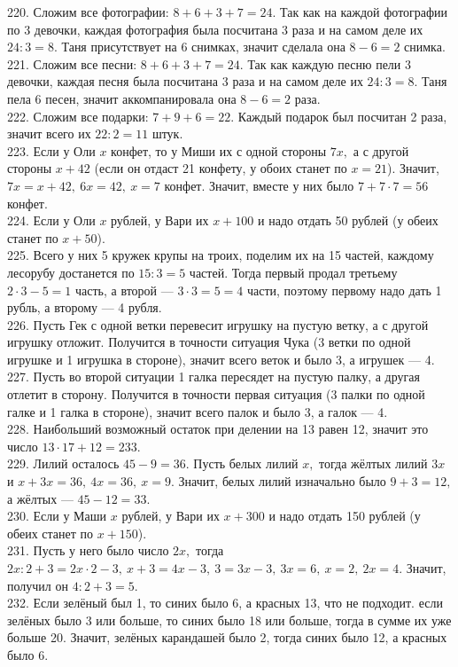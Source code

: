 \documentclass[12pt]{article}
\begin{document}
220. Сложим все фотографии: $8+6+3+7=24.$ Так как на каждой фотографии по 3 девочки, каждая фотография была посчитана 3 раза и на самом деле их $24:3=8.$ Таня присутствует на 6 снимках, значит сделала она $8-6=2$ снимка.\\
221. Сложим все песни: $8+6+3+7=24.$ Так как каждую песню пели 3 девочки, каждая песня была посчитана 3 раза и на самом деле их $24:3=8.$ Таня пела 6 песен, значит аккомпанировала она $8-6=2$ раза.\\
222. Сложим все подарки: $7+9+6=22.$ Каждый подарок был посчитан 2 раза, значит всего их $22:2=11$ штук.\\
223. Если у Оли $x$ конфет, то у Миши их с одной стороны $7x,$ а с другой стороны $x+42$ (если он отдаст 21 конфету, у обоих станет по $x=21$). Значит, $7x=x+42,\ 6x=42,\ x=7$ конфет. Значит, вместе у них было $7+7\cdot7=56$ конфет.\\
224. Если у Оли $x$ рублей, у Вари их $x+100$ и надо отдать 50 рублей (у обеих станет по $x+50$).\\
225. Всего у них 5 кружек крупы на троих, поделим их на 15 частей, каждому лесорубу достанется по $15:3=5$ частей. Тогда первый продал третьему $2\cdot3-5=1$ часть, а второй --- $3\cdot3=5=4$ части, поэтому первому надо дать 1 рубль, а второму --- 4 рубля.\\
226. Пусть Гек с одной ветки перевесит игрушку на пустую ветку, а с другой игрушку отложит. Получится в точности ситуация Чука (3 ветки по одной игрушке и 1 игрушка в стороне), значит всего веток и было 3, а игрушек --- 4.\\
227. Пусть во второй ситуации 1 галка пересядет на пустую палку, а другая отлетит в сторону. Получится в точности первая ситуация (3 палки по одной галке и 1 галка в стороне), значит всего палок и было 3, а галок --- 4.\\
228. Наибольший возможный остаток при делении на 13 равен 12, значит это число $13\cdot17+12=233.$\\
229. Лилий осталось $45-9=36.$ Пусть белых лилий $x,$ тогда жёлтых лилий $3x$ и $x+3x=36,\ 4x=36,\ x=9.$ Значит, белых лилий изначально было $9+3=12,$ а жёлтых --- $45-12=33.$\\
230. Если у Маши $x$ рублей, у Вари их $x+300$ и надо отдать 150 рублей (у обеих станет по $x+150$).\\
231. Пусть у него было число $2x,$ тогда $2x:2+3=2x\cdot2-3,\ x+3=4x-3,\ 3=3x-3,\ 3x=6,\ x=2,\ 2x=4.$ Значит, получил он $4:2+3=5.$\\
232. Если зелёный был 1, то синих было 6, а красных 13, что не подходит. если зелёных было 3 или больше, то синих было 18 или больше, тогда в сумме их уже больше 20. Значит, зелёных карандашей было 2, тогда синих было 12, а красных было 6.\\
\end{document}
